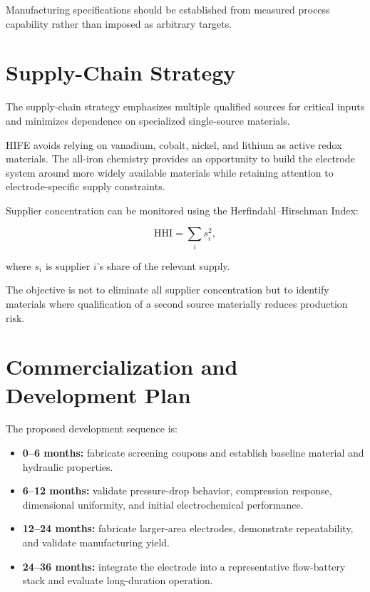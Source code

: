 \documentclass[11pt,letterpaper]{article}
\begin{document}
Manufacturing specifications should be established from measured process
capability rather than imposed as arbitrary targets.


\section{Supply-Chain Strategy}

The supply-chain strategy emphasizes multiple qualified sources for critical
inputs and minimizes dependence on specialized single-source materials.

HIFE avoids relying on vanadium, cobalt, nickel, and lithium as active redox
materials. The all-iron chemistry provides an opportunity to build the
electrode system around more widely available materials while retaining
attention to electrode-specific supply constraints.

Supplier concentration can be monitored using the Herfindahl--Hirschman
Index:

\begin{equation}
\mathrm{HHI}
=
\sum_i s_i^2,
\label{eq:hhi}
\end{equation}

where $s_i$ is supplier $i$'s share of the relevant supply.

The objective is not to eliminate all supplier concentration but to identify
materials where qualification of a second source materially reduces
production risk.


\section{Commercialization and Development Plan}

The proposed development sequence is:

\begin{itemize}
    \item \textbf{0--6 months:} fabricate screening coupons and establish
    baseline material and hydraulic properties.

    \item \textbf{6--12 months:} validate pressure-drop behavior,
    compression response, dimensional uniformity, and initial
    electrochemical performance.

    \item \textbf{12--24 months:} fabricate larger-area electrodes,
    demonstrate repeatability, and validate manufacturing yield.

    \item \textbf{24--36 months:} integrate the electrode into a
    representative flow-battery stack and evaluate long-duration
    operation.
\end{itemize}
\end{document}
